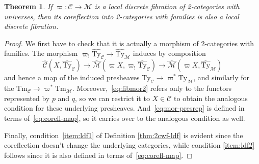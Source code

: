 \documentclass[10pt]{article}
\newtheorem{theorem}{Theorem}
\theoremstyle{definition}
\newcommand\M{\mathcal{M}}
\newcommand\Mhat{\widehat{\mathcal{M}}}
\newcommand\Mty{{\mathrm{Ty}_{\M}}}
\newcommand\Mtm{{\mathrm{Tm}_{\M}}}
\newcommand\Mtyhat{{\widehat{\mathrm{Ty}}_{\M}}}
\newcommand\C{\mathcal{C}}
\newcommand\Chat{{\widehat{\mathcal{C}}}}
\newcommand\Cty{\mathrm{Ty}_{\C}}
\newcommand\Ctm{\mathrm{Tm}_{\C}}
\newcommand\Ctyhat{{\widehat{\mathrm{Ty}}}_{\C}}
\newcommand\vp{\varpi}
\newcommand\vpst{\vp^*}
\newcommand\vpsh{\vp_!}
\begin{document}
\begin{theorem}\label{thm:corefl-ldfib}
  If $\vp:\C\to \M$ is a local discrete fibration of 2-categories with universes, then its coreflection into 2-categories with families is also a local discrete fibration.
\end{theorem}
\begin{proof}
  We first have to check that it is actually a morphism of 2-categories with families.
  The morphism $\vpsh \Ctyhat \to \Mtyhat$ induces by composition
  \begin{equation}
    \Chat(X,\Ctyhat) \to \Mhat(\vp X, \vpsh \Ctyhat) \to \Mhat(\vp X,\Mtyhat)\label{eq:corefl-map}
  \end{equation}
  and hence a map of the induced presheaves $\Cty \to \vpst \Mty$, and similarly for the $\Ctm \to \vpst \Mtm$.
  Moreover,~\eqref{eq:fibmor2} refers only to the functors represented by $p$ and $q$, so we can restrict it to $X\in\C$ to obtain the analogous condition for these underlying presheaves.
  And~\eqref{eq:mor-presrep} is defined in terms of~\eqref{eq:corefl-map}, so it carries over to the analogous condition as well.

  Finally, condition~\ref{item:ldf1} of Definition \ref{thm:2cwf-ldf} is evident since the coreflection doesn't change the underlying categories, while condition \ref{item:ldf2} follows since it is also defined in terms of~\eqref{eq:corefl-map}.
\end{proof}
\end{document}

